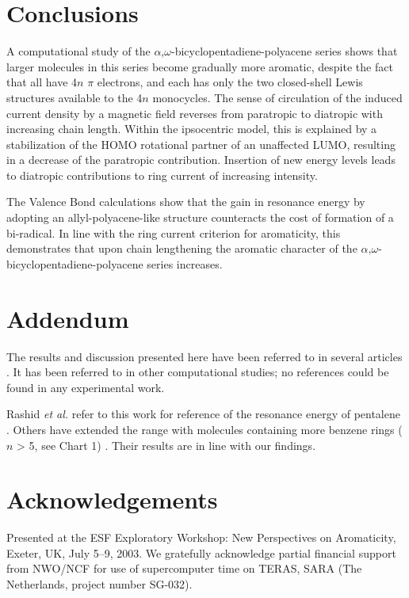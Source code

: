 \section{Conclusions}

A computational study of the $\alpha$,$\omega$-bicyclopentadiene-polyacene series shows that larger molecules in this series become gradually more aromatic, despite the fact that all have 4$n$ $\pi$ electrons, and each has only the two closed-shell Lewis structures available to the 4$n$ monocycles. The sense of circulation of the induced current density by a magnetic field reverses from paratropic to diatropic with increasing chain length. Within the ipsocentric model, this is explained by a stabilization of the HOMO rotational partner of an unaffected LUMO, resulting in a decrease of the paratropic contribution. Insertion of new energy levels leads to diatropic contributions to ring current of increasing intensity.

The Valence Bond calculations show that the gain in resonance energy by adopting an allyl-polyacene-like structure counteracts the cost of formation of a bi-radical. In line with the ring current criterion for aromaticity, this demonstrates that upon chain lengthening the aromatic character of the $\alpha$,$\omega$-bicyclopentadiene-polyacene series increases.

\section*{Addendum}
The results and discussion presented here have been referred to in several articles \cite{ac01,ac02,ac03,ac04,ac05,ac06,ac07,ac08}. It has been referred to in other computational studies; no references could be found in any experimental work.

Rashid \textit{et al.} refer to this work for reference of the resonance energy of pentalene \cite{ac03}. Others have extended the range with molecules containing more benzene rings ($n$ > 5, see Chart 1) \cite{ac04,ac07}. Their results are in line with our findings.

\section*{Acknowledgements}

Presented at the ESF Exploratory Workshop: New Perspectives on Aromaticity, Exeter, UK, July 5--9, 2003. We gratefully acknowledge partial financial support from NWO/NCF for use of supercomputer time on TERAS, SARA (The Netherlands, project number \mbox{SG-032}).



